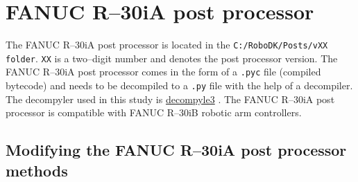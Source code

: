 \section{FANUC R--30iA post processor}

The FANUC R--30iA post processor is located in the \texttt{C:/RoboDK/Posts/vXX folder}. \texttt{XX} is a two--digit number and denotes the post processor version. The FANUC R--30iA post processor comes in the form of a \texttt{.pyc} file (compiled bytecode) and needs to be decompiled to a \texttt{.py} file with the help of a decompiler. The decompyler used in this study is   \href{https://github.com/rocky/python--decompile3}{decompyle3} \cite{decompyle3}. The FANUC R--30iA post processor is compatible with FANUC R--30iB robotic arm controllers.

\subsection{Modifying the FANUC R--30iA post processor methods} 
\label{sec:modifying}

